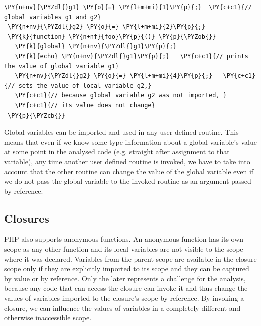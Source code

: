 \begin{Verbatim}[commandchars=\\\{\}]
 \PY{n+nv}{\PYZdl{}g1} \PY{o}{=} \PY{l+m+mi}{1}\PY{p}{;}  \PY{c+c1}{// global variables g1 and g2}
 \PY{n+nv}{\PYZdl{}g2} \PY{o}{=} \PY{l+m+mi}{2}\PY{p}{;}
 \PY{k}{function} \PY{n+nf}{foo}\PY{p}{()} \PY{p}{\PYZob{}}
   \PY{k}{global} \PY{n+nv}{\PYZdl{}g1}\PY{p}{;}
   \PY{k}{echo} \PY{n+nv}{\PYZdl{}g1}\PY{p}{;}   \PY{c+c1}{// prints the value of global variable g1}
   \PY{n+nv}{\PYZdl{}g2} \PY{o}{=} \PY{l+m+mi}{4}\PY{p}{;}   \PY{c+c1}{// sets the value of local variable g2,}
   \PY{c+c1}{// because global variable g2 was not imported, }
   \PY{c+c1}{// its value does not change}
 \PY{p}{\PYZcb{}}
\end{Verbatim}

    Global variables can be imported and used in any user defined 
    routine. This means that even if we know some type information 
    about a global variable's value at some point in the analysed 
    code (e.g. straight after assignment to that variable), 
    any time another user defined routine is invoked, we 
    have to take into account that the other routine can 
    change the value of the global variable even if we do not 
    pass the global variable to the invoked routine 
    as an argument passed by reference.

    \subsection{Closures}
    PHP also supports anonymous functions. An anonymous function has its 
    own scope as any other function and its local variables are not visible 
    to the scope where it was declared. Variables from the parent 
    scope are available in the closure scope only if they are 
    explicitly imported to its scope and they can be captured 
    by value or by reference. Only the later represents a 
    challenge for the analysis, because any code that can 
    access the closure can invoke it and thus change the 
    values of variables imported to the closure's scope 
    by reference. By invoking a closure, we can influence 
    the values of variables in a completely different 
    and otherwise inaccessible scope.
    
